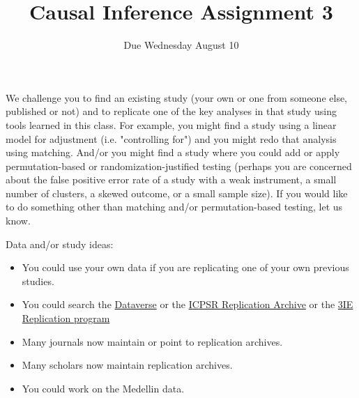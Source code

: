 \documentclass{article}
\title{Causal Inference Assignment 3}
\author{Due Wednesday August 10}
\begin{document}
\maketitle

We challenge you to find an existing study (your own or one from someone else,
published or not) and to replicate one of the key analyses in that study using
tools learned in this class. For example, you might find a study using a linear
model for adjustment (i.e. "controlling for") and you might redo that analysis
using matching. And/or you might find a study where you could add or apply
permutation-based or randomization-justified testing (perhaps you are concerned
about the false positive error rate of a study with a weak instrument, a small
number of clusters, a skewed outcome, or a small sample size). If you would like
to do something other than matching and/or permutation-based testing, let us
know.

Data and/or study ideas: \begin{itemize}
 \item You could use your own data if you are replicating one of your own
      previous studies.
 \item You could search the \href{http://dataverse.org/}{Dataverse} or the
      \href{http://www.icpsr.umich.edu/icpsrweb/deposit/pra/index.jsp}{ICPSR
      Replication Archive} or the
      \href{http://www.3ieimpact.org/evaluation/impact-evaluation-replication-programme/}{3IE
      Replication program}
 \item Many journals now maintain or point to replication archives.
 \item Many scholars now maintain replication archives.
 \item You could work on the Medellin data.
\end{itemize}
\end{document}
